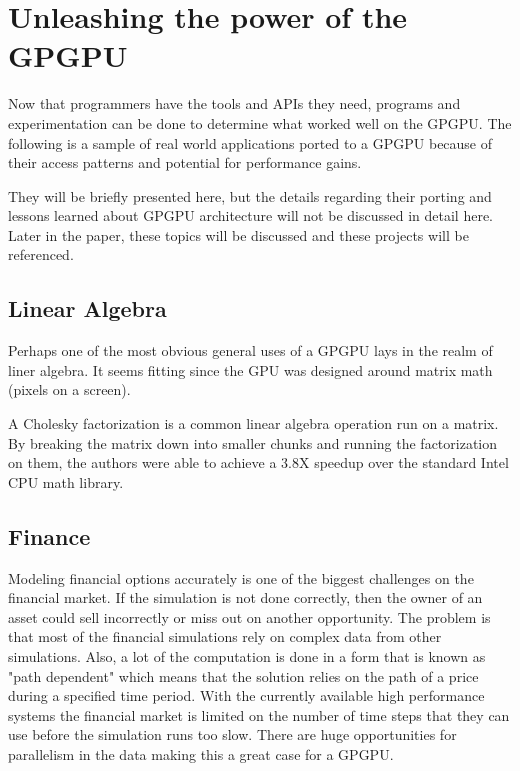 \section*{Unleashing the power of the GPGPU}


Now that programmers have the tools and APIs they need, programs and experimentation can be done to determine what worked well on the GPGPU. The following is a sample of real world applications ported to a GPGPU because of their access patterns and potential for performance gains. 

They will be briefly presented here, but the details regarding their porting and lessons learned about GPGPU architecture will not be discussed in detail here. Later in the paper, these topics will be discussed and these projects will be referenced. 

\subsection*{Linear Algebra}

Perhaps one of the most obvious general uses of a GPGPU lays in the realm of liner algebra. It seems fitting since the GPU was designed around matrix math (pixels on a screen). 

A Cholesky factorization is a common linear algebra operation run on a matrix. By breaking the matrix down into smaller chunks and running the factorization on them, the authors were able to achieve a 3.8X speedup over the standard Intel CPU math library. \cite{linearalg}

\subsection*{Finance}

Modeling financial options accurately is one of the biggest challenges on the financial market. If the simulation is not done correctly, then the owner of an asset could sell incorrectly or miss out on another opportunity. The problem is that most of the financial simulations rely on complex data from other simulations. Also, a lot of the computation is done in a form that is known as "path dependent" which means that the solution relies on the path of a price during a specified time period. With the currently available high performance systems the financial market is limited on the number of time steps that they can use before the simulation runs too slow. There are huge opportunities for parallelism in the data making this a great case for a GPGPU. 


